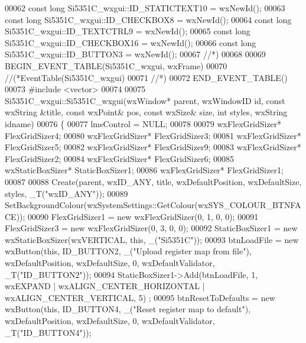 \begin{DoxyCode}
00062 \textcolor{keyword}{const} \textcolor{keywordtype}{long} Si5351C_wxgui::ID_STATICTEXT10 = wxNewId();
00063 \textcolor{keyword}{const} \textcolor{keywordtype}{long} Si5351C_wxgui::ID_CHECKBOX8 = wxNewId();
00064 \textcolor{keyword}{const} \textcolor{keywordtype}{long} Si5351C_wxgui::ID_TEXTCTRL9 = wxNewId();
00065 \textcolor{keyword}{const} \textcolor{keywordtype}{long} Si5351C_wxgui::ID_CHECKBOX16 = wxNewId();
00066 \textcolor{keyword}{const} \textcolor{keywordtype}{long} Si5351C_wxgui::ID_BUTTON3 = wxNewId();
00067 \textcolor{comment}{//*)}
00068 
00069 BEGIN\_EVENT\_TABLE(Si5351C_wxgui, wxFrame)
00070 \textcolor{comment}{//(*EventTable(Si5351C\_wxgui)}
00071 \textcolor{comment}{//*)}
00072 END\_EVENT\_TABLE()
00073 \textcolor{preprocessor}{#include <vector>}
00074 
00075 Si5351C_wxgui::Si5351C_wxgui(wxWindow* parent, wxWindowID \textcolor{keywordtype}{id}, \textcolor{keyword}{const} wxString &title, \textcolor{keyword}{const} wxPoint& pos, \textcolor{keyword}{
      const} wxSize& size, \textcolor{keywordtype}{int} styles, wxString idname)
00076 \{
00077     lmsControl = NULL;
00078 
00079     wxFlexGridSizer* FlexGridSizer4;
00080     wxFlexGridSizer* FlexGridSizer3;
00081     wxFlexGridSizer* FlexGridSizer5;
00082     wxFlexGridSizer* FlexGridSizer9;
00083     wxFlexGridSizer* FlexGridSizer2;
00084     wxFlexGridSizer* FlexGridSizer6;
00085     wxStaticBoxSizer* StaticBoxSizer1;
00086     wxFlexGridSizer* FlexGridSizer1;
00087 
00088     Create(parent, wxID\_ANY, title, wxDefaultPosition, wxDefaultSize, styles, \_T(\textcolor{stringliteral}{"wxID\_ANY"}));
00089     SetBackgroundColour(wxSystemSettings::GetColour(wxSYS\_COLOUR\_BTNFACE));
00090     FlexGridSizer1 = \textcolor{keyword}{new} wxFlexGridSizer(0, 1, 0, 0);
00091     FlexGridSizer3 = \textcolor{keyword}{new} wxFlexGridSizer(0, 3, 0, 0);
00092     StaticBoxSizer1 = \textcolor{keyword}{new} wxStaticBoxSizer(wxVERTICAL, \textcolor{keyword}{this}, \_(\textcolor{stringliteral}{"Si5351C"}));
00093     btnLoadFile = \textcolor{keyword}{new} wxButton(\textcolor{keyword}{this}, ID\_BUTTON2, \_(\textcolor{stringliteral}{"Upload register map from file"}), wxDefaultPosition, 
      wxDefaultSize, 0, wxDefaultValidator, \_T(\textcolor{stringliteral}{"ID\_BUTTON2"}));
00094     StaticBoxSizer1->Add(btnLoadFile, 1, wxEXPAND | wxALIGN\_CENTER\_HORIZONTAL | wxALIGN\_CENTER\_VERTICAL, 5)
      ;
00095     btnResetToDefaults = \textcolor{keyword}{new} wxButton(\textcolor{keyword}{this}, ID\_BUTTON4, \_(\textcolor{stringliteral}{"Reset register map to default"}), 
      wxDefaultPosition, wxDefaultSize, 0, wxDefaultValidator, \_T(\textcolor{stringliteral}{"ID\_BUTTON4"}));

\end{DoxyCode}
